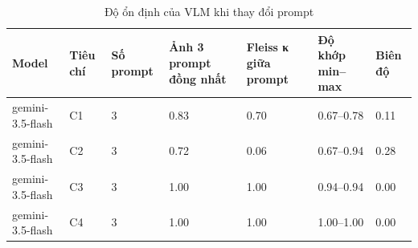 \begin{table}[t]
\centering
\caption{Độ ổn định của VLM khi thay đổi prompt}
\footnotesize
\begin{tabular}{lllllll}
\hline
Model & Tiêu chí & Số prompt & Ảnh 3 prompt đồng nhất & Fleiss κ giữa prompt & Độ khớp min–max & Biên độ \\
\hline
gemini-3.5-flash & C1 & 3 & 0.83 & 0.70 & 0.67–0.78 & 0.11 \\
gemini-3.5-flash & C2 & 3 & 0.72 & 0.06 & 0.67–0.94 & 0.28 \\
gemini-3.5-flash & C3 & 3 & 1.00 & 1.00 & 0.94–0.94 & 0.00 \\
gemini-3.5-flash & C4 & 3 & 1.00 & 1.00 & 1.00–1.00 & 0.00 \\
\hline
\end{tabular}
\end{table}